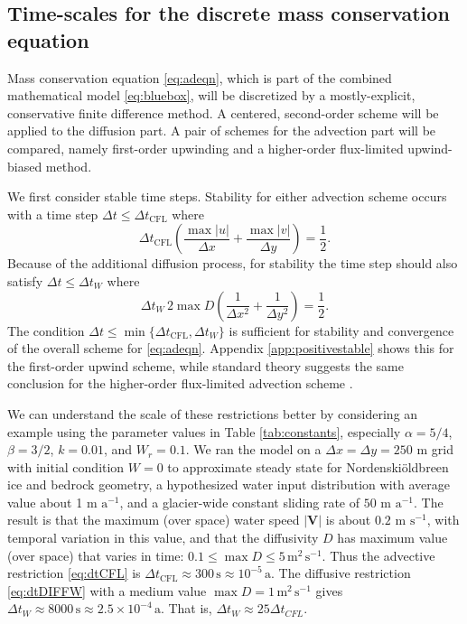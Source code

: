 \documentclass[11pt,final]{amsart}
\newcommand\bV{\mathbf{V}}
\newcommand{\Nbreen}{Nordenski\"oldbreen\xspace}
\begin{document}
\subsection*{Time-scales for the discrete mass conservation equation}  Mass conservation equation \eqref{eq:adeqn}, which is part of the combined mathematical model \eqref{eq:bluebox}, will be discretized by a mostly-explicit, conservative finite difference method.   A centered, second-order scheme will be applied to the diffusion part.  A pair of schemes for the advection part will be compared, namely first-order upwinding and a higher-order flux-limited upwind-biased method.

We first consider stable time steps.  Stability for either advection scheme occurs with a time step $\Delta t \le \Delta t_{\text{CFL}}$ where
\begin{equation}
\Delta t_{\text{CFL}} \left(\frac{\max |u|}{\Delta x} + \frac{\max |v|}{\Delta y}\right) = \frac{1}{2}. \label{eq:dtCFL}
\end{equation}
Because of the additional diffusion process, for stability the time step should also satisfy $\Delta t \le \Delta t_{W}$  where \citep{MortonMayers}
\begin{equation}
\Delta t_W\, 2 \max D \left(\frac{1}{\Delta x^2} + \frac{1}{\Delta y^2}\right) = \frac{1}{2}. \label{eq:dtDIFFW}
\end{equation}
The condition $\Delta t \le \min\{\Delta t_{\text{CFL}}, \Delta t_W\}$ is sufficient for stability and convergence of the overall scheme for \eqref{eq:adeqn}.  Appendix \ref{app:positivestable} shows this for the first-order upwind scheme, while standard theory suggests the same conclusion for the higher-order flux-limited advection scheme \citep{HundsdorferVerwer2010}.

We can understand the scale of these restrictions better by considering an example using the parameter values in Table \ref{tab:constants}, especially $\alpha=5/4$, $\beta=3/2$, $k=0.01$, and $W_r=0.1$.  We ran the model on a $\Delta x = \Delta y = 250$ m grid with initial condition $W=0$ to approximate steady state for \Nbreen ice and bedrock geometry, a hypothesized water input distribution with average value about 1 m $\text{a}^{-1}$, and a glacier-wide constant sliding rate of $50$ m $\text{a}^{-1}$.  The result is that the maximum (over space) water speed $|\bV|$ is about $0.2$ m $\text{s}^{-1}$, with temporal variation in this value, and that the diffusivity $D$ has maximum value (over space) that varies in time: $0.1 \le \max D \le 5 \,\text{m}^2\,\text{s}^{-1}$.  Thus the advective restriction \eqref{eq:dtCFL} is $\Delta t_{\text{CFL}} \approx 300\,\text{s} \approx 10^{-5}\,\text{a}$.  The diffusive restriction \eqref{eq:dtDIFFW} with a medium value $\max D=1\,\text{m}^2\,\text{s}^{-1}$ gives $\Delta t_W \approx 8000\,\text{s} \approx 2.5 \times 10^{-4}\,\text{a}$.   That is, $\Delta t_W \approx 25 \Delta t_{CFL}$.
\end{document}
